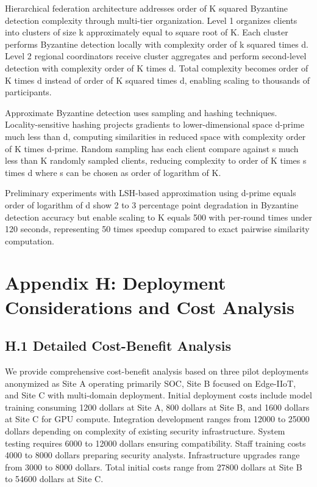 \documentclass[12pt,a4paper]{article}
\theoremstyle{definition}
\begin{document}
Hierarchical federation architecture addresses order of K squared Byzantine detection complexity through multi-tier organization. Level 1 organizes clients into clusters of size k approximately equal to square root of K. Each cluster performs Byzantine detection locally with complexity order of k squared times d. Level 2 regional coordinators receive cluster aggregates and perform second-level detection with complexity order of K times d. Total complexity becomes order of K times d instead of order of K squared times d, enabling scaling to thousands of participants.

Approximate Byzantine detection uses sampling and hashing techniques. Locality-sensitive hashing projects gradients to lower-dimensional space d-prime much less than d, computing similarities in reduced space with complexity order of K times d-prime. Random sampling has each client compare against s much less than K randomly sampled clients, reducing complexity to order of K times s times d where s can be chosen as order of logarithm of K.

Preliminary experiments with LSH-based approximation using d-prime equals order of logarithm of d show 2 to 3 percentage point degradation in Byzantine detection accuracy but enable scaling to K equals 500 with per-round times under 120 seconds, representing 50 times speedup compared to exact pairwise similarity computation.

\section{Appendix H: Deployment Considerations and Cost Analysis}

\subsection{H.1 Detailed Cost-Benefit Analysis}

We provide comprehensive cost-benefit analysis based on three pilot deployments anonymized as Site A operating primarily SOC, Site B focused on Edge-IIoT, and Site C with multi-domain deployment. Initial deployment costs include model training consuming 1200 dollars at Site A, 800 dollars at Site B, and 1600 dollars at Site C for GPU compute. Integration development ranges from 12000 to 25000 dollars depending on complexity of existing security infrastructure. System testing requires 6000 to 12000 dollars ensuring compatibility. Staff training costs 4000 to 8000 dollars preparing security analysts. Infrastructure upgrades range from 3000 to 8000 dollars. Total initial costs range from 27800 dollars at Site B to 54600 dollars at Site C.
\end{document}

